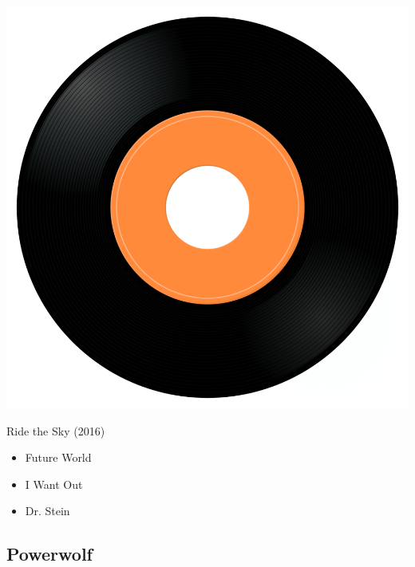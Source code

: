 \begin{minipage}[t]{0.25\textwidth}
\captionsetup{type=figure}
\includegraphics[width=\textwidth]{Images/cover.png}
\caption*{Ride the Sky (2016)}
\end{minipage}
\begin{minipage}[t]{0.25\textwidth}\vspace{0pt}
\begin{itemize}[nosep,leftmargin=1em,labelwidth=*,align=left]
	\setlength{\itemsep}{0pt}
	\item Future World 
	\item I Want Out
	\item Dr. Stein
\end{itemize}
\end{minipage}

\subsection{Powerwolf}

